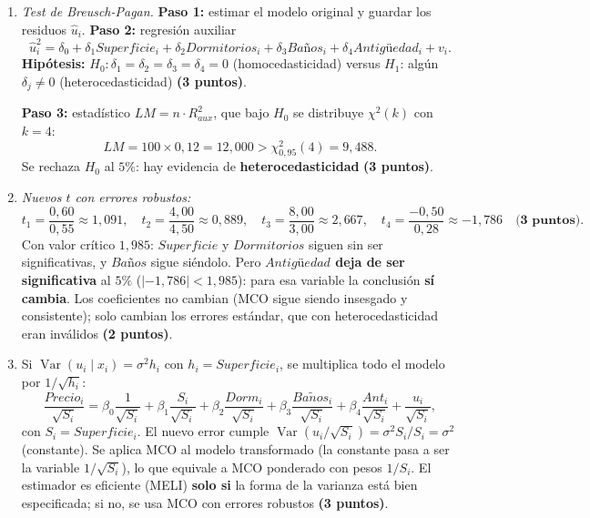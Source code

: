 \documentclass[12pt,letterpaper]{article}
\DeclareMathOperator{\var}{Var}
\begin{document}
\begin{enumerate}
{\begin{enumerate}[label=\alph*)]
    \textit{Sesgo:} \textbf{no}. Mientras la colinealidad no sea perfecta, los estimadores MCO siguen siendo insesgados, consistentes y de mínima varianza lineal; solo pierden precisión. Tampoco afecta a la predicción del modelo \textbf{(3 puntos)}.

    \item \textit{Test de Breusch-Pagan.} \textbf{Paso 1:} estimar el modelo original y guardar los residuos $\hat u_i$. \textbf{Paso 2:} regresión auxiliar
    \[
        \hat u_i^2=\delta_0+\delta_1 Superficie_i+\delta_2 Dormitorios_i+\delta_3 Baños_i+\delta_4 Antigüedad_i+v_i .
    \]
    \textbf{Hipótesis:} $H_0:\delta_1=\delta_2=\delta_3=\delta_4=0$ (homocedasticidad) versus $H_1$: algún $\delta_j\neq0$ (heterocedasticidad) \textbf{(3 puntos)}.

    \textbf{Paso 3:} estadístico $LM=n\cdot R^2_{aux}$, que bajo $H_0$ se distribuye $\chi^2(k)$ con $k=4$:
    \[
        LM=100\times0{,}12=12{,}000>\chi^2_{0,95}(4)=9{,}488 .
    \]
    Se rechaza $H_0$ al $5\%$: hay evidencia de \textbf{heterocedasticidad} \textbf{(3 puntos)}.

    \item \textit{Nuevos $t$ con errores robustos:}
    \[
        t_1=\frac{0{,}60}{0{,}55}\approx1{,}091,\quad
        t_2=\frac{4{,}00}{4{,}50}\approx0{,}889,\quad
        t_3=\frac{8{,}00}{3{,}00}\approx2{,}667,\quad
        t_4=\frac{-0{,}50}{0{,}28}\approx-1{,}786 \quad\textbf{(3 puntos)}.
    \]
    Con valor crítico $1{,}985$: $Superficie$ y $Dormitorios$ siguen sin ser significativas, y $Baños$ sigue siéndolo. Pero \textbf{$Antigüedad$ deja de ser significativa} al $5\%$ ($|-1{,}786|<1{,}985$): para esa variable la conclusión \textbf{sí cambia}. Los coeficientes no cambian (MCO sigue siendo insesgado y consistente); solo cambian los errores estándar, que con heterocedasticidad eran inválidos \textbf{(2 puntos)}.

    \item Si $\var(u_i\mid x_i)=\sigma^2h_i$ con $h_i=Superficie_i$, se multiplica todo el modelo por $1/\sqrt{h_i}$:
    \[
        \frac{Precio_i}{\sqrt{S_i}}=\beta_0\frac{1}{\sqrt{S_i}}+\beta_1\frac{S_i}{\sqrt{S_i}}+\beta_2\frac{Dorm_i}{\sqrt{S_i}}+\beta_3\frac{Ba\tilde nos_i}{\sqrt{S_i}}+\beta_4\frac{Ant_i}{\sqrt{S_i}}+\frac{u_i}{\sqrt{S_i}},
    \]
    con $S_i=Superficie_i$. El nuevo error cumple $\var\!\left(u_i/\sqrt{S_i}\right)=\sigma^2S_i/S_i=\sigma^2$ (constante). Se aplica MCO al modelo transformado (la constante pasa a ser la variable $1/\sqrt{S_i}$), lo que equivale a MCO ponderado con pesos $1/S_i$. El estimador es eficiente (MELI) \textbf{solo si} la forma de la varianza está bien especificada; si no, se usa MCO con errores robustos \textbf{(3 puntos)}.
\end{enumerate}}


\end{enumerate}
\end{document}
